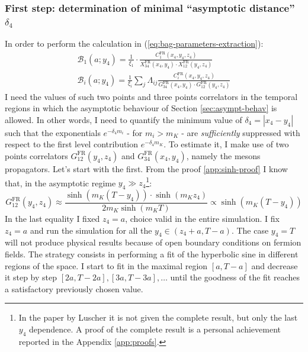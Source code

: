 \documentclass[english, LaM, oneside, noexaminfo]{sapthesis}
\begin{document}
\subsubsection*{First step: determination of minimal ``asymptotic distance'' $\delta_4$}
\noindent
In order to perform the calculation in (\ref{eq:bag-parameters-extraction}):
\begin{equation*}
    \begin{gathered}
        \mathcal{B}_1 (a;y_4) = \frac{1}{\xi_1} \cdot \frac{C_1^\text{FR}(x_4,y_4,z_4)}{X^\text{FR}_{34}(x_4,y_4)\cdot X^\text{FR}_{12}(y_4,z_4)} \\
        \mathcal{B}_i (a;y_4) = \frac{1}{\xi_i} \sum_{j} \Lambda_{ij} \frac{C_i^\text{FR}(x_4,y_4,z_4)}{G^\text{FR}_{34}(x_4,y_4)\cdot G^\text{FR}_{12}(y_4,z_4)}
    \end{gathered}
\end{equation*}
I need the values of such two points and three points correlators in the temporal regions in which the asymptotic behaviour of Section \ref{sec:asympt-behav} is allowed.
In other words, I need to quantify the minimum value of $\delta_4 = |x_4-y_4|$ such that the exponentials $e^{-\delta_4 m_i}$ - for $m_i > m_K$ - are {\it sufficiently} suppressed with respect to the first level contribution $e^{-\delta_4 m_K}$.
To estimate it, I make use of two points correlators $G_{12}^\text{FR}(y_4,z_4)$ and $G_{34}^\text{FR}(x_4, y_4)$, namely the mesons propagators.
Let's start with the first.
From the proof \ref{app:sinh-proof} I know that, in the asymptotic regime $y_4 \gg z_4$\footnote{In the paper \cite{OBC-tm} by Luscher it is not given the complete result, but only the last $y_4$ dependence. A proof of the complete result is a personal achievement reported in the Appendix \ref{app:proofs}.}:
\begin{equation}\label{eq:sinh}
    G_{12}^\text{FR}(y_4,z_4) \approx \frac{\sinh \left( m_K (T - y_4) \right) \cdot \sinh \left( m_K z_4 \right)}{2 m_K \sinh \left( m_K T \right)} \propto \sinh \left( m_K (T - y_4) \right)
\end{equation}
In the last equality I fixed $z_4 = a$, choice valid in the entire simulation.
I fix $z_4 = a$ and run the simulation for all the $y_4 \in (z_4+a,T-a)$.
The case $y_4 = T$ will not produce physical results because of open boundary conditions on fermion fields.
The strategy consists in performing a fit of the hyperbolic sine in different regions of the space.
I start to fit in the maximal region $[a, T-a]$ and decrease it step by step $[2a,T-2a], [3a,T-3a], \dots $ until the goodness of the fit reaches a satisfactory previously chosen value.
\end{document}
